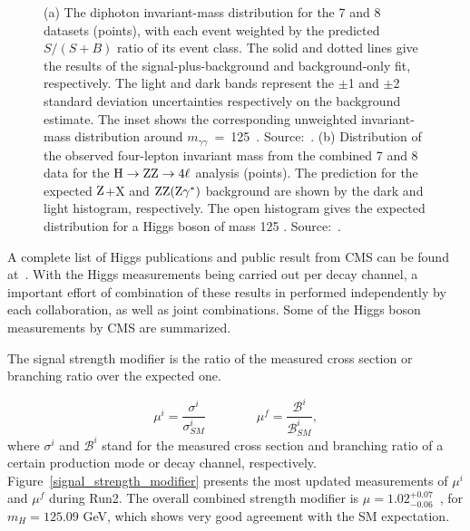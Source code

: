 \begin{figure}[htbp]
\begin{subfigure}[htbp]{0.48\textwidth}
    \caption{}
    \label{higgs_discovery_hzz4l}
  \end{subfigure}
  \label{higgs_discovery}
  \caption{(a) The diphoton invariant-mass distribution for the 7 and 8 \TeV datasets (points), with each event weighted by the predicted $S/(S+B)$ ratio of its event class. The solid and dotted lines give the results of the signal-plus-background and background-only fit, respectively. The light and dark bands represent the $\pm$1 and $\pm$2 standard deviation uncertainties respectively on the background estimate. The inset shows the corresponding unweighted invariant-mass distribution around \mbox{$m_{\gamma\gamma}$ = 125 \GeV}. Source:~\cite{higgs_discovery_cms}. (b) Distribution of the observed four-lepton invariant mass from the combined 7 and 8 \TeV data 
  for the $\mathrm{H} \to \mathrm{Z}\mathrm{Z}\to 4\ell$ analysis (points).
  The prediction for the expected $\mathrm{Z}$+X and $\mathrm{Z}\mathrm{Z}(\mathrm{Z}\gamma^*)$ background are shown by the dark and light histogram, respectively. The open histogram gives the expected distribution for a Higgs boson of mass 125 \GeV. Source:~\cite{higgs_discovery_cms}.}
\end{figure}

A complete list of Higgs publications and public result from CMS can be found at~\cite{cms_higgs_publications,cms_higgs_public_results}. With the Higgs measurements being carried out per decay channel, a important effort of combination of these results in performed independently by each collaboration, as well as joint combinations. Some of the Higgs boson measurements by CMS are summarized.

The signal strength modifier is the ratio of the measured cross section or branching ratio over the expected one. 

\begin{equation}
  \mu^{i} = \frac{\sigma^{i}}{\sigma^{i}_{SM}} \qquad\qquad   \mu^{f} = \frac{\mathcal{B}^{i}}{\mathcal{B}^{i}_{SM}}, 
  \label{signal_strength_modifier}
\end{equation}
where $\sigma^{i}$ and $\mathcal{B}^{i}$ stand for the measured cross section and branching ratio of a certain production mode or decay channel, respectively. Figure~\ref{signal_strength_modifier} presents the most updated measurements of $\mu^{i}$ and  $\mu^{f}$ during Run2. The overall combined strength modifier is $\mu=1.02^{+0.07}_{-0.06}$~\cite{cms_higgs_comb_run2}, for $m_{H} = 125.09$ GeV, which shows very good agreement with the SM expectation.

